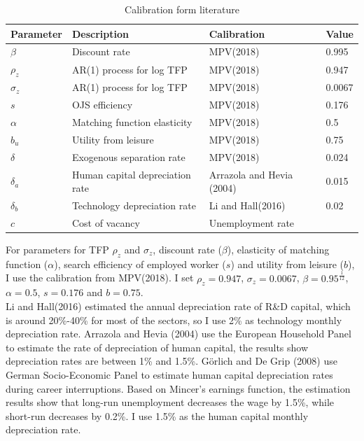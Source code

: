 \documentclass[12pt]{article}
\newcommand{\1}{\mathbb{1}}
\begin{document}
\begin{table}[h!]
\begin{tabular}{llll}
\hline \hline
Parameter     &       Description      & Calibration &  Value                    \\
\hline 
$\beta$ & Discount rate & MPV(2018) & 0.995 \\
$\rho_z$   &  AR(1) process for log TFP & MPV(2018) & 0.947 \\
$\sigma_z$ &  AR(1) process for log TFP & MPV(2018) & 0.0067 \\
$s$ & OJS efficiency & MPV(2018) & 0.176\\
$\alpha$ & Matching function elasticity & MPV(2018) & 0.5\\
$b_u$ & Utility from leisure & MPV(2018) & 0.75\\
$\delta$ & Exogenous separation rate & MPV(2018) & 0.024 \\
$\delta_a$ & Human capital depreciation rate & Arrazola and Hevia (2004) & 0.015\\
$\delta_b$ & Technology depreciation rate & Li and Hall(2016) & 0.02\\
$c$ & Cost of vacancy & Unemployment rate \\
\hline 
\end{tabular}
\caption{Calibration form literature}
\label{Calibration1}
\end{table}

For parameters for TFP $\rho_z$ and $\sigma_z$, discount rate ($\beta$), elasticity of matching function ($\alpha$), search efficiency of employed worker ($s$) and utility from leisure ($b$), I use the calibration from MPV(2018)\cite{MPV2018}. I set $\rho_z = 0.947$, $\sigma_z = 0.0067$, $\beta = 0.95^{\frac{1}{12}}$, $\alpha = 0.5$, $s = 0.176$ and $b = 0.75$. \\

Li and Hall(2016)\cite{LiHall2016} estimated the annual depreciation rate of R\&D capital, which is around 20\%-40\% for most of the sectors, so I use 2\% as technology monthly depreciation rate. Arrazola and Hevia (2004)\cite{ArrazolaHevia2004} use the European Household Panel to estimate the rate of depreciation of human capital, the results show depreciation rates are between 1\% and 1.5\%. G{\"o}rlich and De Grip (2008)\cite{GorlichDeGrip2008} use German Socio-Economic Panel to estimate human capital depreciation rates during career interruptions. Based on Mincer’s earnings function, the estimation results show that long-run unemployment decreases the wage by 1.5\%, while short-run decreases by 0.2\%. I use 1.5\% as the human capital monthly depreciation rate. \\
\end{document}
